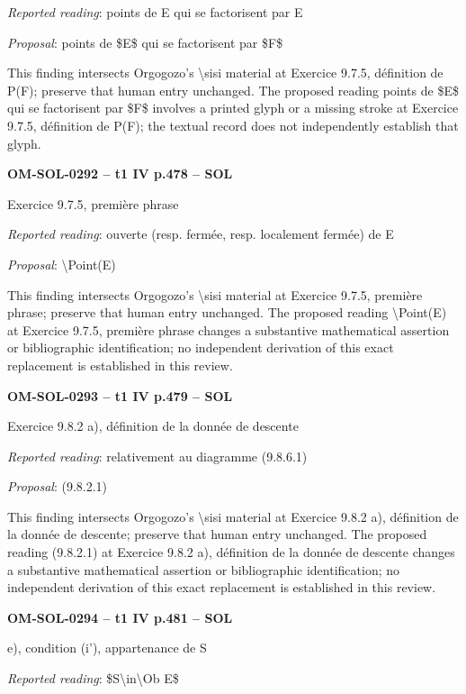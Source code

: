 \emph{Reported reading}: points de E qui se factorisent par E\par
\emph{Proposal}: points de \$E\$ qui se factorisent par \$F\$\par
This finding intersects Orgogozo's \textbackslash{}sisi material at Exercice 9.7.5, définition de P(F); preserve that human entry unchanged. The proposed reading points de \$E\$ qui se factorisent par \$F\$ involves a printed glyph or a missing stroke at Exercice 9.7.5, définition de P(F); the textual record does not independently establish that glyph.\par
\par\noindent\textbf{OM-SOL-0292 -- t1 IV p.478 -- SOL}\par
Exercice 9.7.5, première phrase\par
\emph{Reported reading}: ouverte (resp. fermée, resp. localement fermée) de E\par
\emph{Proposal}: \textbackslash{}Point(E)\par
This finding intersects Orgogozo's \textbackslash{}sisi material at Exercice 9.7.5, première phrase; preserve that human entry unchanged. The proposed reading \textbackslash{}Point(E) at Exercice 9.7.5, première phrase changes a substantive mathematical assertion or bibliographic identification; no independent derivation of this exact replacement is established in this review.\par
\par\noindent\textbf{OM-SOL-0293 -- t1 IV p.479 -- SOL}\par
Exercice 9.8.2 a), définition de la donnée de descente\par
\emph{Reported reading}: relativement au diagramme (9.8.6.1)\par
\emph{Proposal}: (9.8.2.1)\par
This finding intersects Orgogozo's \textbackslash{}sisi material at Exercice 9.8.2 a), définition de la donnée de descente; preserve that human entry unchanged. The proposed reading (9.8.2.1) at Exercice 9.8.2 a), définition de la donnée de descente changes a substantive mathematical assertion or bibliographic identification; no independent derivation of this exact replacement is established in this review.\par
\par\noindent\textbf{OM-SOL-0294 -- t1 IV p.481 -- SOL}\par
e), condition (i'), appartenance de S\par
\emph{Reported reading}: \$S\textbackslash{}in\textbackslash{}Ob E\$\par
